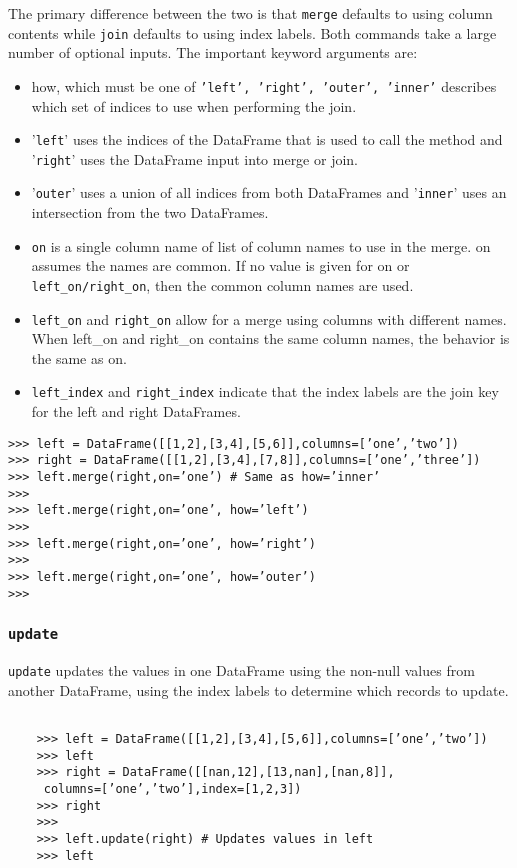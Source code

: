 \documentclass[KSmain.tex]{subfiles}
\begin{document}
\noindent The primary difference between the two is that \texttt{merge} defaults to using column contents while
\texttt{join} defaults to using index labels. Both commands take a large number of optional inputs. The important
keyword arguments are:
\begin{itemize}
\item how, which must be one of \texttt{’left’, ’right’, ’outer’, ’inner’} describes which set of indices to use
when performing the join. 
\item ’\texttt{left}’ uses the indices of the DataFrame that is used to call the method
and ’\texttt{right}’ uses the DataFrame input into merge or join.
\item ’\texttt{outer}’ uses a union of all indices from
both DataFrames and ’\texttt{inner}’ uses an intersection from the two DataFrames.


\item \texttt{on} is a single column name of list of column names to use in the merge. on assumes the names are
common. If no value is given for on or \texttt{left\_on/right\_on}, then the common column names are used.
\item  \texttt{left\_on} and \texttt{right\_on} allow for a merge using columns with different names. When left\_on and
right\_on contains the same column names, the behavior is the same as on.
\item  \texttt{left\_index} and \texttt{right\_index} indicate that the index labels are the join key for the left and right
DataFrames.
\end{itemize}
\begin{framed}
\begin{verbatim}
>>> left = DataFrame([[1,2],[3,4],[5,6]],columns=[’one’,’two’])
>>> right = DataFrame([[1,2],[3,4],[7,8]],columns=[’one’,’three’])
>>> left.merge(right,on=’one’) # Same as how=’inner’
>>>
>>> left.merge(right,on=’one’, how=’left’)
>>>
>>> left.merge(right,on=’one’, how=’right’)
>>>
>>> left.merge(right,on=’one’, how=’outer’)
>>>
\end{verbatim}
\end{framed}
\newpage
\subsubsection*{\texttt{update}}
	\texttt{update} updates the values in one DataFrame using the non-null values from another DataFrame, using
	the index labels to determine which records to update.
\begin{framed}
	\begin{verbatim}

	>>> left = DataFrame([[1,2],[3,4],[5,6]],columns=[’one’,’two’])
	>>> left
	>>> right = DataFrame([[nan,12],[13,nan],[nan,8]],
	 columns=[’one’,’two’],index=[1,2,3])
	>>> right
	>>>
	>>> left.update(right) # Updates values in left
	>>> left
	
	\end{verbatim}
	\end{framed}
	
\end{document}
